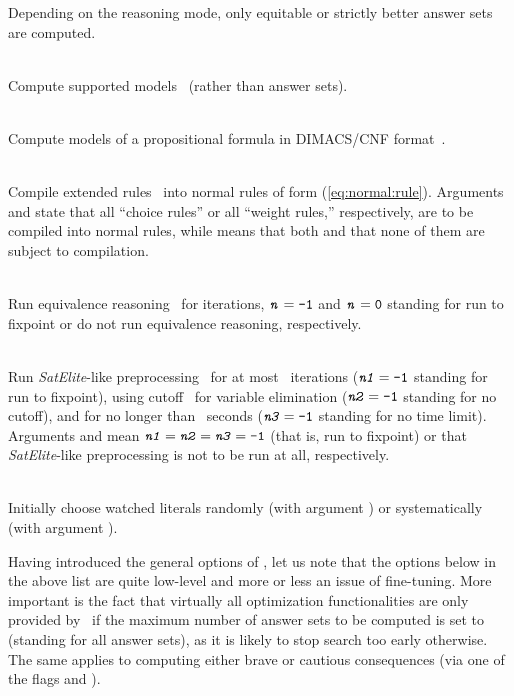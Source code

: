 \begin{description}
Depending on the reasoning mode,
only equitable or strictly better answer sets are computed.
\item[\code{--supp-models}]~\\
Compute supported models~\cite{apblwa88a} (rather than answer sets).
\item[\code{--dimacs}]~\\
Compute models of a propositional formula in DIMACS/CNF format~\cite{dimacs}.
\item[\code{--trans-ext all|choice|weight|no}]~\\
Compile extended rules~\cite{siniso02a} into normal rules of form (\ref{eq:normal:rule}).
Arguments  and 
state that all ``choice rules'' or all ``weight rules,'' respectively,
are to be compiled into normal rules,
while  means that both and  that none of them
are subject to compilation.
\item[\code{--eq \textit{n}}]~\\
Run equivalence reasoning~\cite{gekanesc08a} for  iterations,
$\texttt{\textit{n}}=\texttt{-1}$ and $\texttt{\textit{n}}=\texttt{0}$ standing for
run to fixpoint or do not run equivalence reasoning, respectively.
\item[\code{--sat-prepro yes|no|\textit{n1}[,\textit{n2},\textit{n3}]}]~\\
Run \emph{SatElite}-like preprocessing~\cite{eenbie05a}
for at most~ iterations 
($\texttt{\textit{n1}}=\texttt{-1}$ standing for run to fixpoint),
using cutoff~ for variable elimination
($\texttt{\textit{n2}}=\texttt{-1}$ standing for no cutoff), and
for no longer than~ seconds
($\texttt{\textit{n3}}=\texttt{-1}$ standing for no time limit).
Arguments  and  mean
$\texttt{\textit{n1}}=\texttt{\textit{n2}}=\texttt{\textit{n3}}=\texttt{-1}$
(that is, run to fixpoint)
or that \emph{SatElite}-like preprocessing is not to be run at all, respectively.
\item[\code{--rand-watches yes|no}]~\\
Initially choose watched literals randomly (with argument )
or systematically (with argument ).
\end{description}
%
Having introduced the general options of \clasp,
let us note that the options below  in the above list
are quite low-level and more or less an issue of fine-tuning.
More important is the fact that virtually all optimization functionalities
are only provided by \clasp\ if the maximum number of answer sets to be
computed is set to~ (standing for all answer sets),
as it is likely to stop search too early otherwise.
The same applies to computing either brave or cautious consequences
(via one of the flags  and ).


